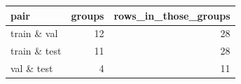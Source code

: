 \begin{tabular}{lrr}
\toprule
pair & groups & rows\_in\_those\_groups \\
\midrule
train \& val & 12 & 28 \\
train \& test & 11 & 28 \\
val \& test & 4 & 11 \\
\bottomrule
\end{tabular}
